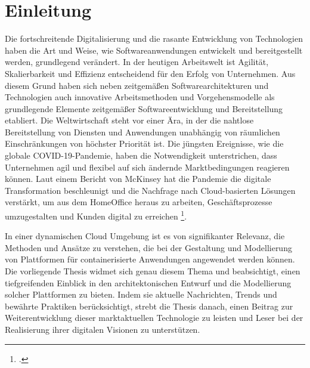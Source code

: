 \newpage
\section{Einleitung}\label{lab:einleitung}
Die fortschreitende Digitalisierung und die rasante Entwicklung von Technologien haben die Art und Weise, wie Softwareanwendungen entwickelt und bereitgestellt werden, grundlegend verändert. In der heutigen Arbeitswelt ist Agilität, Skalierbarkeit und Effizienz entscheidend für den Erfolg von Unternehmen. Aus diesem Grund haben sich neben zeitgemäßen Softwarearchitekturen und Technologien auch innovative Arbeitsmethoden und Vorgehensmodelle als grundlegende Elemente zeitgemäßer Softwareentwicklung und Bereitstellung etabliert. Die Weltwirtschaft steht vor einer Ära, in der die nahtlose Bereitstellung von Diensten und Anwendungen unabhängig von räumlichen Einschränkungen von höchster Priorität ist. Die jüngsten Ereignisse, wie die globale COVID-19-Pandemie, haben die Notwendigkeit unterstrichen, dass Unternehmen agil und flexibel auf sich ändernde Marktbedingungen reagieren können. Laut einem Bericht von McKinsey hat die Pandemie die digitale Transformation beschleunigt und die Nachfrage nach Cloud-basierten Lösungen verstärkt, um aus dem HomeOffice heraus zu arbeiten, Geschäftsprozesse umzugestalten und Kunden digital zu erreichen \footcite[Vgl.][o.S.]{McKinsey2020}.

In einer dynamischen Cloud Umgebung ist es von signifikanter Relevanz, die Methoden und Ansätze zu verstehen, die bei der Gestaltung und Modellierung von \cn Plattformen für containerisierte Anwendungen angewendet werden können. Die vorliegende Thesis widmet sich genau diesem Thema und beabsichtigt, einen tiefgreifenden Einblick in den architektonischen Entwurf und die Modellierung solcher Plattformen zu bieten. Indem sie aktuelle Nachrichten, Trends und bewährte Praktiken berücksichtigt, strebt die Thesis danach, einen Beitrag zur Weiterentwicklung dieser marktaktuellen Technologie zu leisten und Leser bei der Realisierung ihrer digitalen Visionen zu unterstützen.


